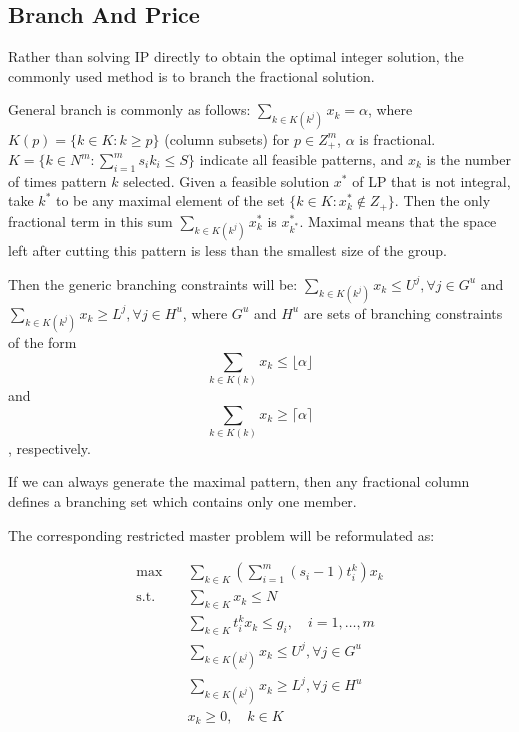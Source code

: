 \subsection{Branch And Price}
Rather than solving IP directly to obtain the optimal integer solution, the commonly used method is to branch the fractional solution.

General branch is commonly as follows:
$\sum_{k \in K\left(k^{j}\right)} x_{k} = \alpha$, where $K(p) = \{k \in K: k\geq p\}$ (column subsets) for $p \in Z^m_+$, $\alpha$ is fractional.
$K = \{k \in N^m: \sum_{i=1}^m s_i k_i \leq S\}$ indicate all feasible patterns, and $x_k$ is the number of times pattern $k$ selected.
Given a feasible solution $x^*$ of LP that is not integral, take $k^*$ to be any maximal element of the set $\{k \in K: x_k^* \notin Z_+\}$. Then the only fractional term in this sum $\sum_{k \in K\left(k^{j}\right)} x_{k}^*$ is $x_{k^*}^*$.
Maximal means that the space left after cutting this pattern is less than the smallest size of the group.

Then the generic branching constraints will be:
$\sum_{k \in K(k^j)} x_{k} \leq U^{j}, \forall j \in G^u$ and $\sum_{k \in K(k^j)} x_{k} \geq L^{j}, \forall j \in H^u$, where $G^u$ and $H^u$ are sets of branching constraints of the form
\begin{equation}
 \sum_{k \in {K(k)}} x_{k} \leq\lfloor\alpha\rfloor
\end{equation} and
\begin{equation}
\sum_{k \in {K(k)}} x_{k} \geq \lceil\alpha\rceil
\end{equation}, respectively.

If we can always generate the maximal pattern, then any fractional column defines a branching set which contains only one member.

The corresponding restricted master problem will be reformulated as:

\[\begin{split}\mbox{max}\quad & \sum_{k\in K}(\sum_{i=1}^m (s_i-1)t_i^k) x_{k}\\
\mbox{s.t.} \quad & \sum_{k \in K} x_{k} \leq N \\
& \sum_{k \in K} t_i^k x_k \leq g_i,\quad i=1,\ldots,m\\
& \sum_{k \in K(k^j)} x_{k} \leq U^{j}, \forall j \in G^u \\
& \sum_{k \in K(k^j)} x_{k} \geq L^{j}, \forall j \in H^u \\
& x_{k} \geq 0, \quad k \in K
\end{split}\]

